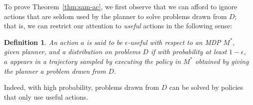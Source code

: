\documentclass[letterpaper]{article} %
\newtheorem{definition}{Definition}
\begin{document}

To prove Theorem~\ref{thm:sam-ac}, we first observe that we can afford to ignore actions that are seldom used by the planner to solve problems drawn from $D$; that is, we can restrict our attention to \emph{useful} actions in the following sense:

\begin{definition}
An action $a$ is said to be \emph{$\epsilon$-useful} with respect to an MDP $M^*$, given planner, and a distribution on problems $D$ if with probability at least $1-\epsilon$, $a$ appears in a trajectory sampled by executing the policy in $M^*$ obtained by giving the planner a problem drawn from $D$. 
\end{definition}

\noindent
Indeed, with high probability, problems drawn from $D$ can be solved by policies that only use useful actions.
\end{document}
